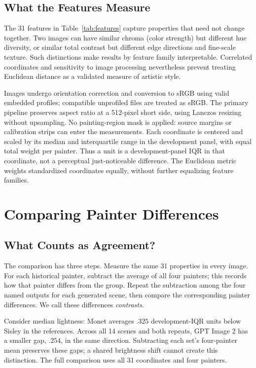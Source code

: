 \subsection{What the Features Measure}\label{sec:features}
The 31 features in Table~\ref{tab:features} capture properties that need not
change together. Two images can have similar chroma (color strength) but different
hue diversity, or similar total contrast but different edge directions and
fine-scale texture. Such distinctions make results by feature family interpretable.
Correlated coordinates and sensitivity to image processing nevertheless prevent
treating Euclidean distance as a validated measure of artistic style.



Images undergo orientation correction and conversion to sRGB using valid
embedded profiles; compatible unprofiled files are treated as sRGB. The primary
pipeline preserves aspect ratio at a 512-pixel short side, using Lanczos resizing
without upsampling. No painting-region mask is applied: source margins or
calibration strips can enter the measurements. Each coordinate is centered and scaled by its
median and interquartile range in the development panel, with equal total
weight per painter. Thus a unit is a development-panel IQR in that coordinate,
not a perceptual just-noticeable difference. The Euclidean metric weights
standardized coordinates equally, without further equalizing feature families.



\section{Comparing Painter Differences}\label{sec:method}
\subsection{What Counts as Agreement?}\label{sec:contrast-intuition}
The comparison has three steps. Measure the same 31 properties in every image.
For each historical painter, subtract the average of all four painters; this
records how that painter differs from the group. Repeat the subtraction among
the four named outputs for each generated scene, then compare the corresponding
painter differences. We call these differences \emph{contrasts}.

Consider median lightness: Monet averages $.325$ development-IQR units below
Sisley in the references. Across all 14 scenes and both repeats, GPT Image 2
has a smaller gap, $.254$, in the same direction. Subtracting each set's
four-painter mean preserves these gaps; a shared brightness shift cannot create
this distinction. The full comparison uses all 31 coordinates and four painters.

